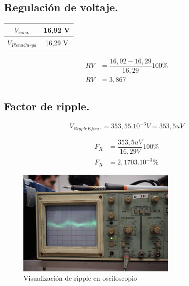 \subsection{Regulación de voltaje.}

\begin{table}[H]
  \centering
  \begin{tabular}{|c|c|}
    \hline
    $V_{vacio}$ & 16,92 V \\ \hline
    $V_{PlenaCarga}$ & 16,29 V \\ \hline
  \end{tabular}
\end{table}

\begin{equation}
  \begin{aligned}
    RV &= \dfrac{16,92 - 16,29}{16,29} 100\percent\\
    RV &= 3,867
  \end{aligned}
\end{equation}

\subsection{Factor de ripple.}

\begin{equation}
  V_{RippleEficaz} = 353,55 . 10^{-6} V = 353,5 uV 
\end{equation}

\begin{equation}
  \begin{aligned}
    F_R &= \dfrac{353,5 uV}{16,29 V} 100\percent\\
    F_R &= 2,1703 . 10^{-3}\percent
  \end{aligned}
\end{equation}

\begin{figure}[H]
  \centering
  \includegraphics[width=0.70\textwidth]{images/medicionRipple.png}
  \caption{Visualización de ripple en osciloscopio}
\end{figure}


